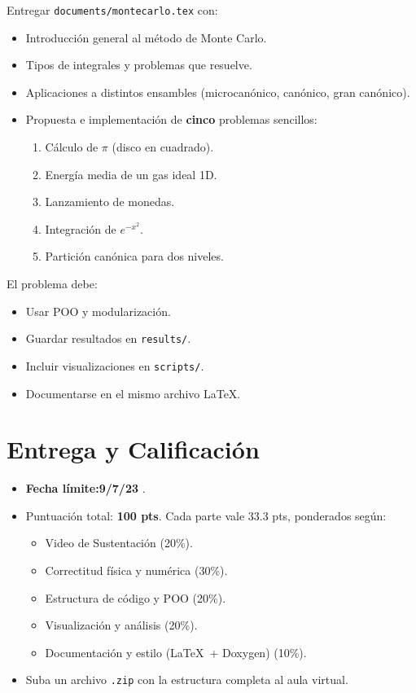 \documentclass[11pt]{article}
\begin{document}
Entregar \texttt{documents/montecarlo.tex} con:
\begin{itemize}
  \item Introducción general al método de Monte Carlo.
  \item Tipos de integrales y problemas que resuelve.
  \item Aplicaciones a distintos ensambles (microcanónico, canónico, gran canónico).
  \item Propuesta e implementación de \textbf{cinco} problemas sencillos:
    \begin{enumerate}[label=\alph*)]
      \item Cálculo de $\pi$ (disco en cuadrado).
      \item Energía media de un gas ideal 1D.
      \item Lanzamiento de monedas.
      \item Integración de $e^{-x^2}$.
      \item Partición canónica para dos niveles.
    \end{enumerate}
\end{itemize}

El problema debe:
\begin{itemize}
  \item Usar POO y modularización.
  \item Guardar resultados en \texttt{results/}.
  \item Incluir visualizaciones en \texttt{scripts/}.
  \item Documentarse en el mismo archivo \LaTeX.
\end{itemize}

\section*{Entrega y Calificación}
\begin{itemize}
  \item \textbf{Fecha límite:9/7/23} .
  \item Puntuación total: \textbf{100 pts}.  Cada parte vale 33.3 pts, ponderados según:
    \begin{itemize}
      \item Video de Sustentación  (20\%).  
      \item Correctitud física y numérica (30\%).
      \item Estructura de código y POO (20\%).
      \item Visualización y análisis (20\%).
      \item Documentación y estilo (\LaTeX\ + Doxygen) (10\%).
    \end{itemize}
  \item Suba un archivo \texttt{.zip} con la estructura completa al aula virtual.
\end{itemize}
\end{document}
